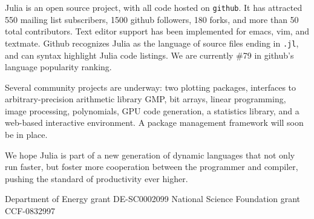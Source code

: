 \documentclass[9pt]{sigplanconf}
\begin{document}
Julia is an open source project, with all code hosted on {\tt github}.
It has attracted 550 mailing list subscribers, 1500 github followers,
180 forks, and more than 50 total contributors. Text editor support
has been implemented for emacs, vim, and textmate.
Github recognizes Julia as the language of source files ending in
{\tt .jl}, and can syntax highlight Julia code listings.
We are currently \#79 in github's language popularity ranking.

Several community projects are underway: two plotting packages,
interfaces to arbitrary-precision arithmetic library GMP,
bit arrays, linear programming, image processing, polynomials,
GPU code generation, a statistics library, and a web-based interactive
environment. A package management framework will soon be in place.

We hope Julia is part of a new generation of dynamic languages that not
only run faster, but foster more cooperation between the programmer
and compiler, pushing the standard of productivity ever higher.







\acks
Department of Energy grant DE-SC0002099
National Science Foundation grant CCF-0832997




%
\end{document}
